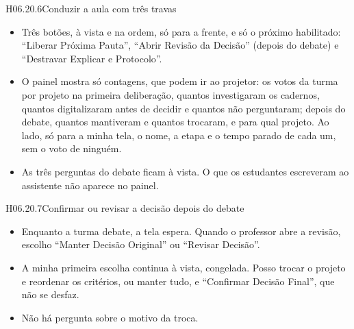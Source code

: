 \begin{historia}{H06.20.6}{Conduzir a aula com três travas}{\pronto}
\aceite
\begin{itemize}
  \item Três botões, à vista e na ordem, só para a frente, e só o próximo
    habilitado: \enquote{Liberar Próxima Pauta}, \enquote{Abrir Revisão da
    Decisão} (depois do debate) e \enquote{Destravar Explicar e Protocolo}.
  \item O painel mostra só contagens, que podem ir ao projetor: os votos da
    turma por projeto na primeira deliberação, quantos investigaram os
    cadernos, quantos digitalizaram antes de decidir e quantos não
    perguntaram; depois do debate, quantos mantiveram e quantos trocaram, e
    para qual projeto. Ao lado, só para a minha tela, o nome, a etapa e o
    tempo parado de cada um, sem o voto de ninguém.
  \item As três perguntas do debate ficam à vista. O que os estudantes
    escreveram ao assistente não aparece no painel.
\end{itemize}
\end{historia}

\begin{historia}{H06.20.7}{Confirmar ou revisar a decisão depois do debate}{\pronto}
\aceite
\begin{itemize}
  \item Enquanto a turma debate, a tela espera. Quando o professor abre a
    revisão, escolho \enquote{Manter Decisão Original} ou \enquote{Revisar
    Decisão}.
  \item A minha primeira escolha continua à vista, congelada. Posso trocar o
    projeto e reordenar os critérios, ou manter tudo, e \enquote{Confirmar
    Decisão Final}, que não se desfaz.
  \item Não há pergunta sobre o motivo da troca.
\end{itemize}
\end{historia}


